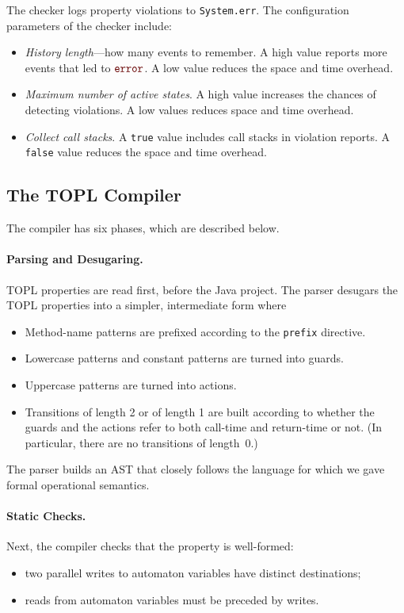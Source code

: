 \documentclass[10pt, preprint]{sigplanconf} %
\newcommand{\error}{\ensuremath{\textcolor{darkred}{\mathtt{error}}}\xspace}
\begin{document}
The checker logs property violations to {\tt System.err}.
The configuration parameters of the checker include:
\begin{itemize}
\item \emph{History length}---how many events to remember.
  A high value reports more events that led to \error.
  A low value reduces the space and time overhead.
\item \emph{Maximum number of active states}.
  A high value increases the chances of detecting violations.
  A low values reduces space and time overhead.
\item \emph{Collect call stacks}.
  A {\tt true} value includes call stacks in violation reports.
  A {\tt false} value reduces the space and time overhead.
\end{itemize}

\subsection{The TOPL Compiler} \label{sec:toplc} %

The compiler has six phases, which are described below.

\paragraph{Parsing and Desugaring.}
TOPL properties are read first, before the Java project.
The parser desugars the TOPL properties into a simpler, intermediate form where
\begin{itemize}
\item Method-name patterns are prefixed according to the {\tt prefix} directive.
\item Lowercase patterns and constant patterns are turned into guards.
\item Uppercase patterns are turned into actions.
\item Transitions of length 2 or of length 1 are built according to whether the guards and the actions refer to both call-time and return-time or not. (In particular, there are no transitions of length~$0$.)
\end{itemize}
The parser builds an AST that closely follows the language for which we gave formal operational semantics.

\paragraph{Static Checks.}
Next, the compiler checks that the property is well-formed:
\begin{itemize}
\item two parallel writes to automaton variables have distinct destinations;
\item reads from automaton variables must be preceded by writes.
\end{itemize}
\end{document}
